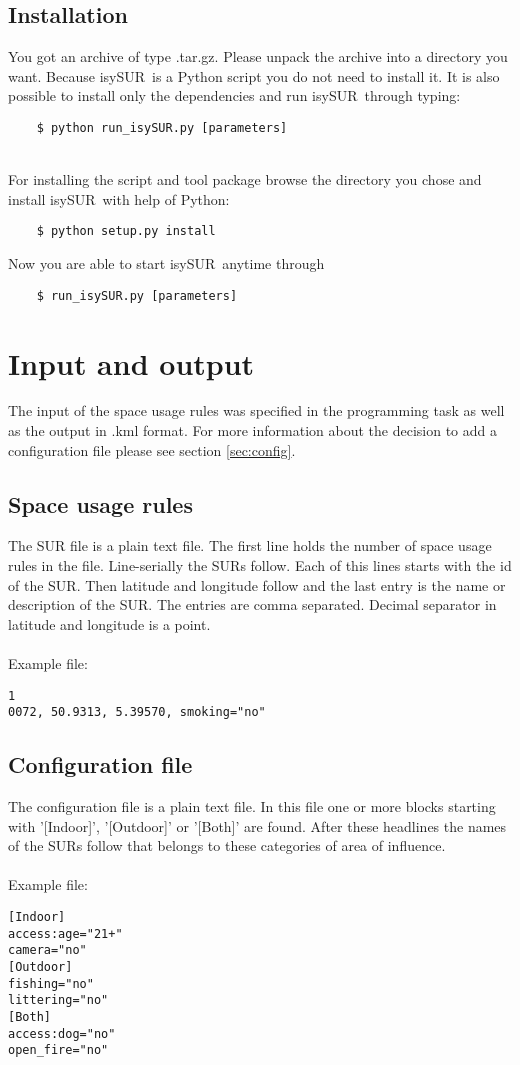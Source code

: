 \documentclass[11pt,fleqn]{book} %
\newcommand{\ProjectTitle}{isySUR}
\newcommand{\pt}{\ProjectTitle}
\begin{document}
\subsection{Installation}
You got an archive of type .tar.gz. Please unpack the archive into a directory you want. Because \pt\ is a Python script you do not need to install it. It is also possible to install only the dependencies and run \pt\ through typing:
\begin{verbatim}
	$ python run_isySUR.py [parameters]
\end{verbatim}
~\\

For installing the script and tool package browse the directory you chose and install \pt\ with help of Python:
\begin{verbatim}
	$ python setup.py install
\end{verbatim}
Now you are able to start \pt\ anytime through
\begin{verbatim}
	$ run_isySUR.py [parameters]
\end{verbatim}

\section{Input and output}\label{sec:io}
The input of the space usage rules was specified in the programming task as well as the output in .kml format. For more information about the decision to add a configuration file please see section \ref{sec:config}.

\subsection{Space usage rules}
The SUR file is a plain text file. The first line holds the number of space usage rules in the file. Line-serially the SURs follow. Each of this lines starts with the id of the SUR. Then latitude and longitude follow and the last entry is the name or description of the SUR. The entries are comma separated. Decimal separator in latitude and longitude is a point.
\\~\\
Example file:
\begin{verbatim}
1
0072, 50.9313, 5.39570, smoking="no"
\end{verbatim}

\subsection{Configuration file}
The configuration file is a plain text file. In this file one or more blocks starting with '[Indoor]', '[Outdoor]' or '[Both]' are found. After these headlines the names of the SURs follow that belongs to these categories of area of influence.
\\~\\
Example file:
\begin{verbatim}
[Indoor]
access:age="21+"
camera="no"
[Outdoor]
fishing="no"
littering="no"
[Both]
access:dog="no"
open_fire="no"
\end{verbatim}
\end{document}
